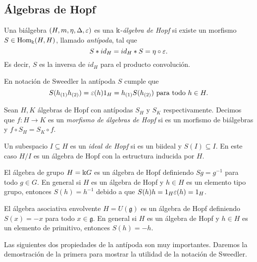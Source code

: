 \documentclass[a4paper,oneside,fleqn,11pt,../tesis.tex]{subfiles}
\begin{document}
\subsection{Álgebras de Hopf}

\begin{definition}
	Una biálgebra $\left(H, m, \eta, \Delta, \varepsilon \right)$ es una $\Bbbk$-\emph{álgebra de Hopf} si existe
	un morfismo $S \in \operatorname{Hom}_{\Bbbk}(H, H)$, llamado \emph{antípoda}, tal que
	\[
		S \ast id_{H}  = id_{H} \ast S = \eta \circ \varepsilon.
	\]
	Es decir, $S$ es la inversa de $id_H$ para el producto convolución.
\end{definition}

En notación de Sweedler la antípoda $S$ cumple que 
\[
	S(h_{(1)}h_{(2)}) = \varepsilon(h) 1_{H} = h_{(1)}S(h_{(2)}) \text{ para todo } h \in H.
\]

\begin{definition}
	Sean $H, K$ álgebras de Hopf con antípodas $S_H$ y $S_K$ respectivamente. Decimos que $f: H \to K$
	es un \emph{morfismo de álgebras de Hopf} si es un morfismo de biálgebras y $f \circ S_H = S_K \circ f$.
\end{definition}

\begin{definition}
	Un subespacio $I \subseteq H$ es un \emph{ideal de Hopf} si es un biideal y $S(I) \subseteq I$. En este caso
	$H / I$ es un álgebra de Hopf con la estructura inducida por $H$.
\end{definition}

\begin{example}
	El álgebra de grupo $H = \Bbbk G$ es un álgebra de Hopf definiendo $Sg = g^{-1}$ para todo $g \in G$. En general
	si $H$ es un álgebra de Hopf y $h \in H$ es un elemento tipo grupo, entonces $S(h) = h^{-1}$ debido a que
	$S(h)h = 1_{H} \varepsilon(h) = 1_{H}$.
\end{example}

\begin{example}
	El álgebra asociativa envolvente $H = U(\mathfrak{g})$ es un álgebra de Hopf definiendo $S(x) = -x$ para todo $x \in \mathfrak{g}$.
	En general si $H$ es un álgebra de Hopf y $h \in H$ es un elemento de primitivo, entonces $S(h) = -h$.
\end{example}

Las siguientes dos propiedades de la antípoda son muy importantes. Daremos la demostración de la primera para mostrar la utilidad de
la notación de Sweedler.
\end{document}
